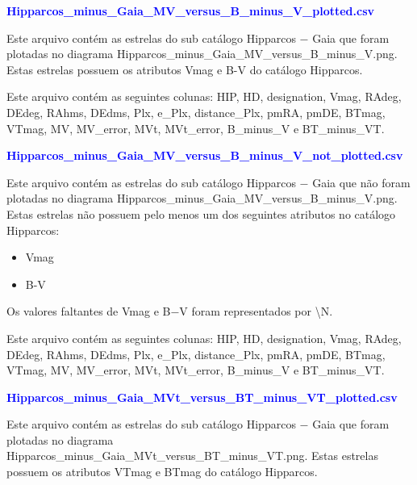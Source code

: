 \documentclass{article}
\begin{document}
	\vspace{10pt}
	
	\textcolor{blue}{\textbf{Hipparcos\_minus\_Gaia\_MV\_versus\_B\_minus\_V\_plotted.csv}}
		
	\vspace{10pt}
		
	Este arquivo contém as estrelas do sub catálogo Hipparcos $-$ Gaia que foram plotadas no diagrama Hipparcos\_minus\_Gaia\_MV\_versus\_B\_minus\_V.png. 
	Estas estrelas possuem os atributos Vmag e B-V do catálogo Hipparcos.
	
	Este arquivo contém as seguintes colunas:
	HIP, HD, designation, Vmag, RAdeg, DEdeg, RAhms, DEdms, Plx, e\_Plx, distance\_Plx, pmRA, pmDE, BTmag, VTmag, MV, MV\_error, MVt, MVt\_error, B\_minus\_V e BT\_minus\_VT.
	
	\vspace{10pt}
		
	\textcolor{blue}{\textbf{Hipparcos\_minus\_Gaia\_MV\_versus\_B\_minus\_V\_not\_plotted.csv}}	
	
	\vspace{10pt}
		
	Este arquivo contém as estrelas do sub catálogo Hipparcos $-$ Gaia que não foram plotadas no diagrama Hipparcos\_minus\_Gaia\_MV\_versus\_B\_minus\_V.png.
	Estas estrelas não possuem pelo menos um dos seguintes atributos no catálogo Hipparcos: 
	
	\begin{itemize}
		\item Vmag
		\item B-V
	\end{itemize}

	Os valores faltantes de Vmag e B$-$V foram representados por \textbackslash N.
	
	Este arquivo contém as seguintes colunas:
	HIP, HD, designation, Vmag, RAdeg, DEdeg, RAhms, DEdms, Plx, e\_Plx, distance\_Plx, pmRA, pmDE, BTmag, VTmag, MV, MV\_error, MVt, MVt\_error, B\_minus\_V e BT\_minus\_VT.
	
	\vspace{10pt}
		
	\textcolor{blue}{\textbf{Hipparcos\_minus\_Gaia\_MVt\_versus\_BT\_minus\_VT\_plotted.csv}}
	
	\vspace{10pt}

	Este arquivo contém as estrelas do sub catálogo Hipparcos $-$ Gaia que foram plotadas no diagrama Hipparcos\_minus\_Gaia\_MVt\_versus\_BT\_minus\_VT.png.
	Estas estrelas possuem os atributos VTmag e BTmag do catálogo Hipparcos.
	
\end{document}
